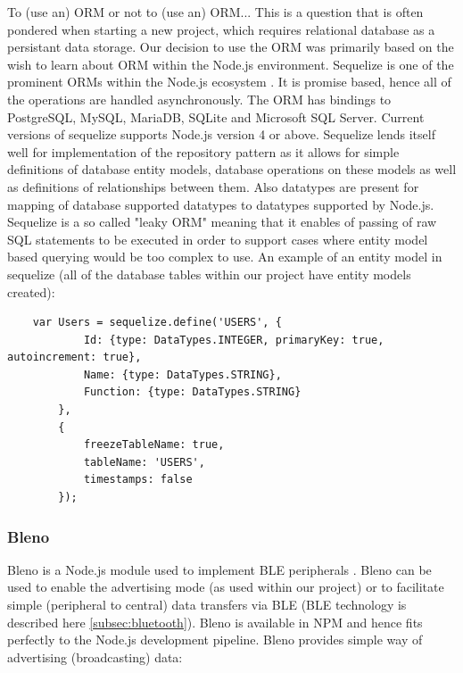To (use an) ORM or not to (use an) ORM... This is a question that is often pondered when starting a new project, which requires relational database as a persistant data storage. Our decision to use the ORM was primarily based on the wish to learn about ORM within the Node.js environment. Sequelize is one of the prominent ORMs within the Node.js ecosystem \citep{sequelize}. It is promise based, hence all of the operations are handled asynchronously. The ORM has bindings to PostgreSQL, MySQL, MariaDB, SQLite and Microsoft SQL Server. Current versions of sequelize supports Node.js version 4 or above. Sequelize lends itself well for implementation of the repository pattern as it allows for simple definitions of database entity models, database operations on these models as well as definitions of relationships between them. Also datatypes are present for mapping of database supported datatypes to datatypes supported by Node.js. Sequelize is a so called "leaky ORM" meaning that it enables of passing of raw SQL statements to be executed in order to support cases where entity model based querying would be too complex to use. An example of an entity model in sequelize (all of the database tables within our project have entity models created):\newline

\smallskip
\begin{lstlisting}
    var Users = sequelize.define('USERS', {
            Id: {type: DataTypes.INTEGER, primaryKey: true, autoincrement: true},
            Name: {type: DataTypes.STRING},
            Function: {type: DataTypes.STRING}
        },
        {
            freezeTableName: true,
            tableName: 'USERS',
            timestamps: false
        });
\end{lstlisting}
\smallskip

\subsubsection{Bleno}
\label{subsubsec:bleno}

Bleno is a Node.js module used to implement BLE peripherals \citep{bleno}. Bleno can be used to enable the advertising mode (as used within our project) or to facilitate simple (peripheral to central) data transfers via BLE (BLE technology is described here \autoref{subsec:bluetooth}). Bleno is available in NPM and hence fits perfectly to the Node.js development pipeline. Bleno provides simple way of advertising (broadcasting) data: \newline

